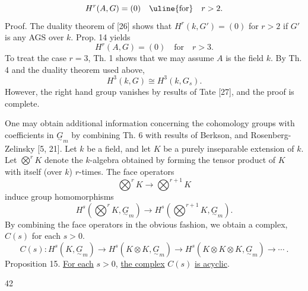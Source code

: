 \[
H^r(A,G)=(0)\quad\uline{\text{for}}\quad r>2.
\]
Proof. The duality theorem of [26] shows that $H^r(k,G')=(0)$ for $r>2$ if $G'$ is any AGS over $k$. Prop. 14 yields
\[
H^r(A,G)=(0)\quad\text{for}\quad r>3.
\]
To treat the case $r=3$, Th. 1 shows that we may assume $A$ is the field $k$. By Th. 4 and the duality theorem used above,
\[
H^3(k,G)\cong H^3(k,G_s).
\]
However, the right hand group vanishes by results of Tate [27], and the proof is complete.

One may obtain additional information concerning the cohomology groups with coefficients in $\underset{\sim}{G}_m$ by combining Th. 6 with results of Berkson, and Rosenberg-Zelinsky [5, 21]. Let $k$ be a field, and let $K$ be a purely inseparable extension of $k$. Let $\bigotimes^rK$ denote the $k$-algebra obtained by forming the tensor product of $K$ with itself (over $k$) $r$-times. The face operators
\[
\bigotimes^rK\to\bigotimes^{r+1}K
\]
induce group homomorphisms
\[
H^s(\bigotimes^rK,\underset{\sim}{G}_m)\to H^s(\bigotimes^{r+1}K,\underset{\sim}{G}_m).
\]
By combining the face operators in the obvious fashion, we obtain a complex, $C(s)$ for each $s>0$.
\[
C(s):H^s(K,\underset{\sim}{G}_m)\to H^s(K\otimes K,\underset{\sim}{G}_m)\to H^s(K\otimes K\otimes K,\underset{\sim}{G}_m)\to\cdots\ .
\]
Proposition 15. \uline{For each} $s>0$, \uline{the complex} $C(s)$ \uline{is acyclic}.

\begin{center}42\end{center}

